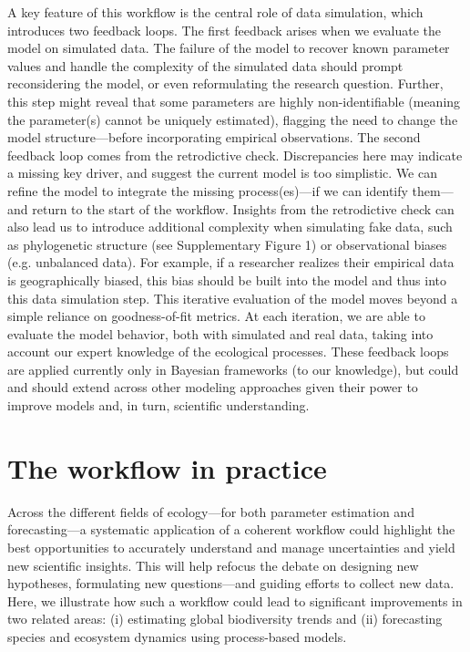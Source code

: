\documentclass[11pt]{article}
\newcommand{\llabel}[1]{\hypertarget{lintarget:#1}{}\linelabel{lin:#1}}
\begin{document}
A key feature of this workflow is the central role of data simulation, which introduces two feedback loops.
The first feedback arises when we evaluate the model on simulated data.
The failure of the model to recover known parameter values and handle the complexity of the simulated data should prompt reconsidering the model, or even reformulating the research question.
Further, this step might reveal that some parameters are highly non-identifiable (meaning the parameter(s) cannot be uniquely estimated), flagging the need to change the model structure---before incorporating empirical observations. 
The second feedback loop comes from the retrodictive check. 
Discrepancies here may indicate a missing key driver, and suggest the current model is too simplistic. We can refine the model to integrate the missing process(es)---if we can identify them---and return to the start of the workflow. Insights from the retrodictive check can also lead us to introduce additional complexity when simulating fake data, such as phylogenetic structure \llabel{suppfig2}(see Supplementary Figure 1) or observational biases (e.g. unbalanced data). For example, if a researcher realizes their empirical data is geographically biased, this bias should be built into the model and thus into this data simulation step. This iterative evaluation of the model moves beyond a simple reliance on goodness-of-fit metrics. At each iteration, we are able to evaluate the model behavior, both with simulated and real data, taking into account our expert knowledge of the ecological processes. \llabel{broadcontext}These feedback loops are applied currently only in Bayesian frameworks (to our knowledge), but could and should extend across other modeling approaches given their power to improve models and, in turn, scientific understanding.

\section{The workflow in practice}

Across the different fields of ecology---for both parameter estimation and forecasting---a systematic application of a coherent workflow could highlight the best opportunities to accurately \llabel{quant1}understand and manage uncertainties and yield new scientific insights. This will help refocus the debate on designing new hypotheses, formulating new questions---and guiding efforts to collect new data. Here, we illustrate how such a workflow could lead to significant improvements in two related areas: (i) estimating global biodiversity trends and (ii) forecasting species and ecosystem dynamics using process-based models.
\end{document}
